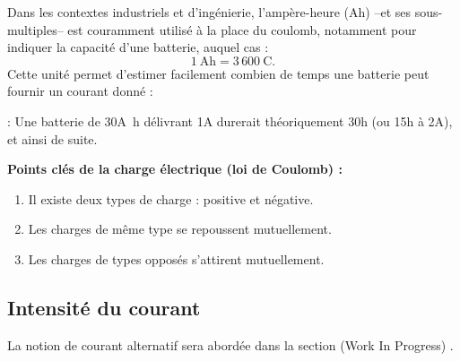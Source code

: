 \begin{figure}[H]
  \centering
\end{figure}

Dans les contextes industriels et d’ing\'enierie, l’amp\`ere-heure (Ah) --et ses
sous-multiples-- est couramment utilis\'e à la place du coulomb, notamment pour
indiquer la capacit\'e d’une batterie, auquel cas :
\[
  1~\unit{\ampere\hour} = 3\,600~\unit{\coulomb}.
\]
Cette unit\'e permet d’estimer facilement combien de temps une batterie peut
fournir un courant donn\'e :
\begin{example}:\newline
Une batterie de 30\unit{\ampere\hour}
d\'elivrant 1\unit{\ampere} durerait th\'eoriquement 30\unit{\hour} (ou 15\unit{\hour} à
2\unit{\ampere}), et ainsi de suite.
\end{example}
\begin{Note}
\textbf{Points cl\'es de la charge \'electrique (loi de Coulomb) :}
\begin{enumerate}
  \item Il existe deux types de charge : positive et n\'egative.
  \item Les charges de m\^eme type se repoussent mutuellement.
  \item Les charges de types oppos\'es s’attirent mutuellement.
\end{enumerate}
\end{Note}

\subsection{Intensit\'e du courant} \label{subsec:current}

\begin{Note}
	La notion de courant alternatif sera abord\'ee dans la section (Work In Progress) .
\end{Note}

